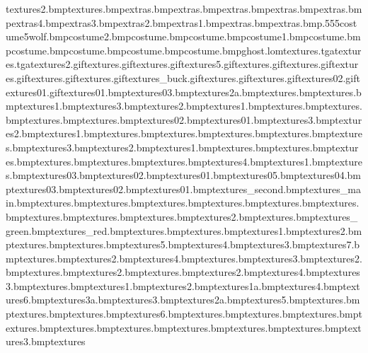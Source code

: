 textures\ghlibarypanels2.bmp textures\spookycpu.bmp extras\mwhisk.bmp extras\mteeth.bmp extras\mpaws.bmp extras\mface.bmp extras\mear.bmp extras\crateoglys4.bmp extras\crateoglys3.bmp extras\crateoglys2.bmp extras\crateoglys1.bmp extras\ball.bmp extras\map.bmp.555 costume\eyetex5wolf.bmp costume\earslined2.bmp costume\noseshine.bmp costume\wolftongueline.bmp costume\wolfteeth1.bmp costume\wolfmuzzlestubble.bmp costume\wolffingers.bmp costume\wolfeyebrow.bmp costume\wolfbodytoes.bmp costume\wolfbodyeyebrow.bmp ghost.lom textures\twwindow.tga textures\ghostweb.tga textures\labtankswitch2.gif textures\labtankswitch.gif textures\datacomp.gif textures\labcomputer5.gif textures\candleflamelight.gif textures\candleflame.gif textures\labgreenbubbly.gif textures\labredbubbly.gif textures\spookypunkin.gif textures\spookywall_buck.gif textures\spookywindows.gif textures\spookypaint.gif textures\spookyeyes02.gif textures\spookyeyes01.gif textures\woodblock01.bmp textures\coins03.bmp textures\gurderend2a.bmp textures\cellbattery.bmp textures\caterpillar.bmp textures\bombbit1.bmp textures\blue3.bmp textures\blue2.bmp textures\blue1.bmp textures\beetle.bmp textures\bat.bmp textures\adder.bmp textures\jackolantern.bmp textures\ingredientsjar02.bmp textures\ingredientsjar01.bmp textures\green3.bmp textures\green2.bmp textures\green1.bmp textures\eyeball.bmp textures\ectoplasm.bmp textures\deathwatchbeetle.bmp textures\spider.bmp textures\screw.bmp textures\purple3.bmp textures\purple2.bmp textures\purple1.bmp textures\pumpkinchunk.bmp textures\paintbrush.bmp textures\ladybird.bmp textures\ketchup.bmp textures\worm.bmp textures\yellowbug.bmp textures\tvbits4.bmp textures\tvbits1.bmp textures\toadstool.bmp textures\splinter03.bmp textures\splinter02.bmp textures\splinter01.bmp textures\whackbit05.bmp textures\whackbit04.bmp textures\whackbit03.bmp textures\whackbit02.bmp textures\whackbit01.bmp textures\ghost_second.bmp textures\ghost_main.bmp textures\flash.bmp textures\gramshined.bmp textures\gramshine.bmp textures\gramhorn.bmp textures\record.bmp textures\gramnut.bmp textures\grambox.bmp textures\gramtop.bmp textures\gramarmcor.bmp textures\gramarmcor2.bmp textures\gramarm.bmp textures\portaloo_green.bmp textures\portaloo_red.bmp textures\portaloodoor.bmp textures\toilettank.bmp textures\toiletseat1.bmp textures\toilet2.bmp textures\toilet.bmp textures\portaloo.bmp textures\labchair5.bmp textures\labchair4.bmp textures\labchair3.bmp textures\labchair7.bmp textures\labchairarm.bmp textures\labchair2.bmp textures\lablight4.bmp textures\lablight.bmp textures\lablight3.bmp textures\lablight2.bmp textures\smokepuff.bmp textures\ghwindows2.bmp textures\spinningblades.bmp textures\gravedebris2.bmp textures\gravedebris4.bmp textures\gravedebris3.bmp textures\gravedebris.bmp textures\grave1.bmp textures\grave2.bmp textures\grave1a.bmp textures\grave4.bmp textures\grave6.bmp textures\grave3a.bmp textures\grave3.bmp textures\grave2a.bmp textures\grave5.bmp textures\gongwanted.bmp textures\ghwindows.bmp textures\ghblade.bmp textures\labchair6.bmp textures\bookneil.bmp textures\labtankedge.bmp textures\labtankpipe.bmp textures\labtankstop.bmp textures\labtanksglass.bmp textures\labtanklight.bmp textures\saloondoors.bmp textures\chain.bmp textures\ghchandalier.bmp textures\ghchandalie3.bmp textures\eleclo